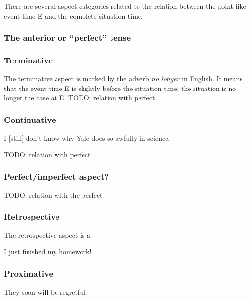 \documentclass[UTF8, a4paper, oneside, scheme=plain, 12pt]{ctexbook}
\newcommand{\form}[1]{\emph{#1}}
\begin{document}
There are several aspect categories related to the relation 
between the point-like event time E 
and the complete situation time.

\subsubsection{The anterior or ``perfect'' tense}\label{sec:vp.tam.anterior}

\subsubsection{Terminative}\label{sec:vp.tam.terminative}

The terminative aspect is marked by the adverb \form{no longer} in English.
It means that the event time E is slightly before the situation time:
the situation is no longer the case at E. 
TODO: relation with perfect 

\subsubsection{Continuative}\label{sec:vp.tam.continuative}

\begin{exe}
    \ex I [still] don't know why Yale does so awfully in science. 
\end{exe}

TODO: relation with perfect 

\subsubsection{Perfect/imperfect aspect?}

TODO: relation with the perfect

\subsubsection{Retrospective}

The retrospective aspect is a 
\begin{exe}
    \ex I just finished my homework!
\end{exe}

\subsubsection{Proximative}

\begin{exe}
    \ex They soon will be regretful.
\end{exe}
\end{document}
